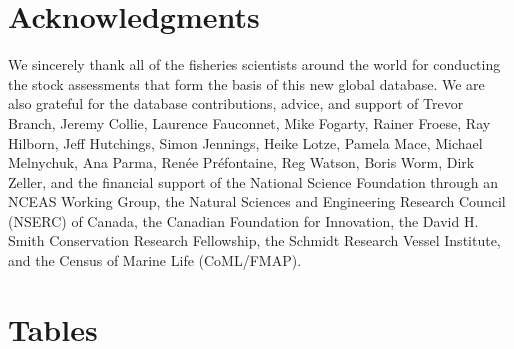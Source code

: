 \documentclass[letterpaper,review,authoryear,12pt]{elsarticle}
\begin{document}
\section*{Acknowledgments }
We sincerely thank all of the fisheries scientists around the world
for conducting the stock assessments that form the basis of this new
global database. We are also grateful for the database contributions,
advice, and support of Trevor Branch, Jeremy Collie, Laurence
Fauconnet, Mike Fogarty, Rainer Froese, Ray Hilborn, Jeff Hutchings,
Simon Jennings, Heike Lotze, Pamela Mace, Michael Melnychuk, Ana
Parma, Ren\'{e}e Pr\'{e}fontaine, Reg Watson, Boris Worm, Dirk Zeller,
and the financial support of the National Science Foundation through
an NCEAS Working Group, the Natural Sciences and Engineering Research
Council (NSERC) of Canada, the Canadian Foundation for Innovation, the
David H. Smith Conservation Research Fellowship, the Schmidt Research
Vessel Institute, and the Census of Marine Life (CoML/FMAP).

\newpage
%
%




%
\section*{Tables}


\end{document}
